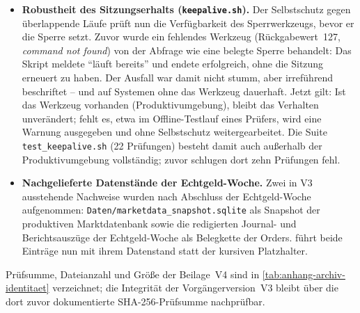\begin{itemize}
  \item \textbf{Robustheit des Sitzungserhalts (\texttt{keepalive.sh}).}
    Der Selbstschutz gegen überlappende Läufe prüft nun die Verfügbarkeit des
    Sperrwerkzeugs, bevor er die Sperre setzt. Zuvor wurde ein fehlendes
    Werkzeug (Rückgabewert~127, \emph{command not found}) von der
    Abfrage wie eine belegte Sperre behandelt: Das Skript meldete
    "`läuft bereits"' und endete erfolgreich, ohne die Sitzung erneuert zu
    haben. Der Ausfall war damit nicht stumm, aber irreführend beschriftet
    -- und auf Systemen ohne das Werkzeug dauerhaft. Jetzt gilt: Ist das
    Werkzeug vorhanden (Produktivumgebung), bleibt das Verhalten
    unverändert; fehlt es, etwa im Offline-Testlauf eines Prüfers, wird eine
    Warnung ausgegeben und ohne Selbstschutz weitergearbeitet. Die Suite
    \texttt{test\_keepalive.sh} (22 Prüfungen) besteht damit auch außerhalb
    der Produktivumgebung vollständig; zuvor schlugen dort zehn Prüfungen
    fehl.
  \item \textbf{Nachgelieferte Datenstände der Echtgeld-Woche.}
    Zwei in V3 ausstehende Nachweise wurden nach Abschluss der
    Echtgeld-Woche aufgenommen: \texttt{Daten/marketdata\_snapshot.sqlite}
    als Snapshot der produktiven Marktdatenbank sowie die redigierten
    Journal- und Berichtsauszüge der Echtgeld-Woche als Belegkette der
    Orders.  führt beide Einträge nun mit
    ihrem Datenstand statt der kursiven Platzhalter.
\end{itemize}

\noindent
Prüfsumme, Dateianzahl und Größe der Beilage~V4 sind in
\cref{tab:anhang-archiv-identitaet} verzeichnet; die Integrität der
Vorgängerversion~V3 bleibt über die dort zuvor dokumentierte
SHA-256-Prüfsumme nachprüfbar.

